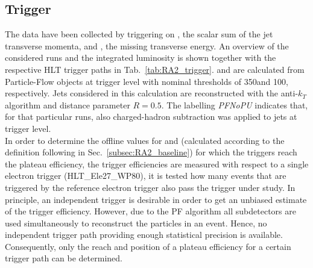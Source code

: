 \subsection{Trigger}
\label{subsec:RA2_trigger}
\begin{table}[!t]
\centering
\caption{Signal trigger paths used in different run ranges listed together with the integrated luminosity.}
\label{tab:RA2_trigger}
\end{table}  
The data have been collected by triggering on \HT, the scalar sum of the jet transverse momenta, and \met, the missing transverse energy. An overview of the considered runs and the integrated luminosity is shown together with the respective HLT trigger paths in Tab.~\ref{tab:RA2_trigger}. \HT and \met are calculated from Particle-Flow objects at trigger level with nominal thresholds of 350\gev and 100\gev, respectively. Jets considered in this calculation are reconstructed with the anti-$k_T$ algorithm and distance parameter $R = 0.5$. The labelling \textit{PFNoPU} indicates that, for that particular runs, also charged-hadron subtraction was applied to jets at trigger level. \\
In order to determine the offline values for \HT and \MHT (calculated according to the definition following in Sec.~\ref{subsec:RA2_baseline}) for which the triggers reach the plateau efficiency, the trigger efficiencies are measured with respect to a single electron trigger (HLT\_Ele27\_WP80), \ie it is tested how many events that are triggered by the reference electron trigger also pass the trigger under study. In principle, an independent trigger is desirable in order to get an unbiased estimate of the trigger efficiency. However, due to the PF algorithm all subdetectors are used simultaneously to reconstruct the particles in an event. Hence, no independent trigger path providing enough statistical precision is available. Consequently, only the reach and position of a plateau efficiency for a certain trigger path can be determined. \\
